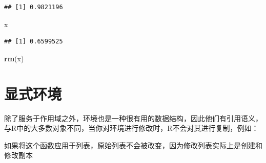 \documentclass[]{book}
\newenvironment{Shaded}{\begin{snugshade}}{\end{snugshade}}
\newcommand{\KeywordTok}[1]{\textcolor[rgb]{0.13,0.29,0.53}{\textbf{#1}}}
\newcommand{\DecValTok}[1]{\textcolor[rgb]{0.00,0.00,0.81}{#1}}
\newcommand{\StringTok}[1]{\textcolor[rgb]{0.31,0.60,0.02}{#1}}
\newcommand{\ControlFlowTok}[1]{\textcolor[rgb]{0.13,0.29,0.53}{\textbf{#1}}}
\newcommand{\OperatorTok}[1]{\textcolor[rgb]{0.81,0.36,0.00}{\textbf{#1}}}
\newcommand{\NormalTok}[1]{#1}
\begin{document}
\begin{Shaded}
\end{Shaded}

\begin{verbatim}
## [1] 0.9821196
\end{verbatim}

\begin{Shaded}
\begin{Highlighting}[]
\NormalTok{x}
\end{Highlighting}
\end{Shaded}

\begin{verbatim}
## [1] 0.6599525
\end{verbatim}

\begin{Shaded}
\begin{Highlighting}[]
\KeywordTok{rm}\NormalTok{(x)}
\end{Highlighting}
\end{Shaded}

\section{显式环境}

除了服务于作用域之外，环境也是一种很有用的数据结构，因此他们有引用语义，与R中的大多数对象不同，当你对环境进行修改时，R不会对其进行复制，例如：

\begin{Shaded}
\end{Shaded}

如果将这个函数应用于列表，原始列表不会被改变，因为修改列表实际上是创建和修改副本

\begin{Shaded}
\end{Shaded}
\end{document}

